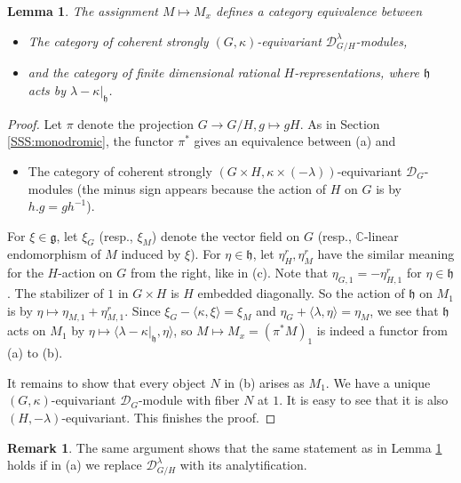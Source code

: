 \documentclass[12pt]{amsart}
\newcommand{\C}{\mathbb{C}}
\newcommand{\g}{\mathfrak{g}}
\newtheorem{Lem}[Thm]{Lemma}
\theoremstyle{definition}
\newtheorem{Rem}[Thm]{Remark}
\numberwithin{equation}{section}
\begin{document}
\begin{Lem}\label{Lem:homog_classif}
The assignment $M\mapsto M_x$ defines a category equivalence between
\begin{itemize}
\item[(a)] The category of coherent strongly $(G,\kappa)$-equivariant $\mathscr{D}^\lambda_{G/H}$-modules,
\item[(b)] and the category of finite dimensional rational $H$-representations, where
$\mathfrak{h}$ acts by $\lambda-\kappa|_{\mathfrak{h}}$.
\end{itemize}
\end{Lem}
\begin{proof}
Let $\pi$ denote the projection $G\rightarrow G/H, g\mapsto gH$. As in Section \ref{SSS:monodromic},
the functor $\pi^*$ gives an equivalence between (a) and
\begin{itemize}
\item[(c)] The category of coherent strongly $(G\times H, \kappa\times (-\lambda))$-equivariant
$\mathscr{D}_G$-modules (the minus sign appears because the action of $H$ on $G$ is by $h.g=gh^{-1}$).
\end{itemize}
For $\xi\in \g$, let $\xi_G$ (resp., $\xi_M$) denote the vector field on $G$ (resp., $\C$-linear endomorphism
of $M$ induced by $\xi$). For $\eta\in \mathfrak{h}$, let $\eta^r_H,\eta^r_M$ have the similar meaning
for the $H$-action on $G$ from the right, like in (c). 
Note that $\eta_{G,1}=-\eta^r_{H,1}$
for $\eta\in \mathfrak{h}$. The stabilizer of $1$ in $G\times H$ is $H$ embedded diagonally. So the action
of $\mathfrak{h}$ on $M_1$ is by $\eta\mapsto \eta_{M,1}+\eta^r_{M,1}$. Since $\xi_G-\langle\kappa,\xi\rangle=\xi_M$
and $\eta_G+\langle\lambda,\eta\rangle=\eta_M$, we see that $\mathfrak{h}$ acts on $M_1$ by
$\eta\mapsto \langle\lambda-\kappa|_{\mathfrak{h}},\eta\rangle$, so $M\mapsto M_{x}=(\pi^*M)_1$
is indeed a functor from (a) to (b).

It remains to show that every object $N$ in (b) arises as $M_1$. We have a unique $(G,\kappa)$-equivariant
$\mathscr{D}_G$-module with fiber $N$ at $1$. It is easy to see that it is also $(H,-\lambda)$-equivariant.
This finishes the proof.
\end{proof}

\begin{Rem}\label{Rem:homog_analyt_classif}
The same argument shows that the same statement as in Lemma \ref{Lem:homog_classif} 
holds if in (a) we replace $\mathscr{D}^\lambda_{G/H}$ with its analytification.
\end{Rem}
\end{document}
